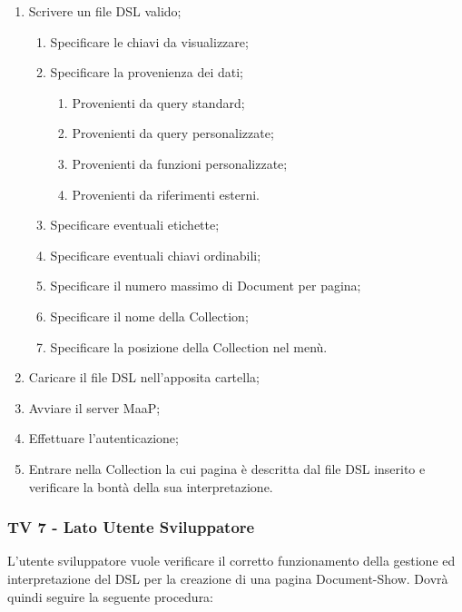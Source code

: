 \begin{enumerate}
\item Scrivere un file DSL valido;
\begin{enumerate}
\item Specificare le chiavi da visualizzare;
\item Specificare la provenienza dei dati;
\begin{enumerate}
\item Provenienti da query standard;
\item Provenienti da query personalizzate;
\item Provenienti da funzioni personalizzate;
\item Provenienti da riferimenti esterni.
\end{enumerate}
\item Specificare eventuali etichette;
\item Specificare eventuali chiavi ordinabili;
\item Specificare il numero massimo di Document per pagina;
\item Specificare il nome della Collection;
\item Specificare la posizione della Collection nel menù.
\end{enumerate}
\item Caricare il file DSL nell'apposita cartella;
\item Avviare il server MaaP;
\item Effettuare l'autenticazione;
\item Entrare nella Collection la cui pagina è descritta dal file DSL inserito e verificare la bontà della sua interpretazione.
\end{enumerate}


\subsubsection{TV 7 - Lato Utente Sviluppatore}

L’utente sviluppatore vuole verificare il corretto funzionamento della gestione ed interpretazione del DSL per la creazione di una pagina Document-Show.
Dovrà quindi seguire la seguente procedura:

